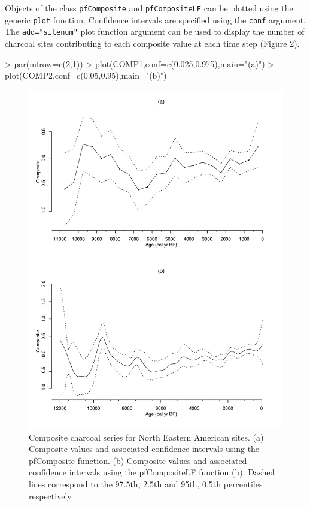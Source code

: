 \documentclass{elsarticle}
\begin{document}
Objects of the class \texttt{pfComposite} and \texttt{pfCompositeLF} can be plotted using the generic \texttt{plot} function. Confidence intervals are specified using the \texttt{conf} argument. The \texttt{add="sitenum"} plot function argument can be used to display the number of charcoal sites contributing to each composite value at each time step (Figure 2). 


\begin{Schunk}
\begin{Sinput}
> par(mfrow=c(2,1))
> plot(COMP1,conf=c(0.025,0.975),main="(a)")
> plot(COMP2,conf=c(0.05,0.95),main="(b)")
\end{Sinput}
\end{Schunk}
\begin{figure}[!ht]
\centering
\includegraphics{paleofire-paper-fig2}
\caption{Composite charcoal series for North Eastern American sites. (a) Composite values and associated confidence intervals using the pfComposite function. (b) Composite values and associated confidence intervals using the pfCompositeLF function (b). Dashed lines correspond to the 97.5th, 2.5th and 95th, 0.5th percentiles respectively.}
\end{figure}
\end{document}
